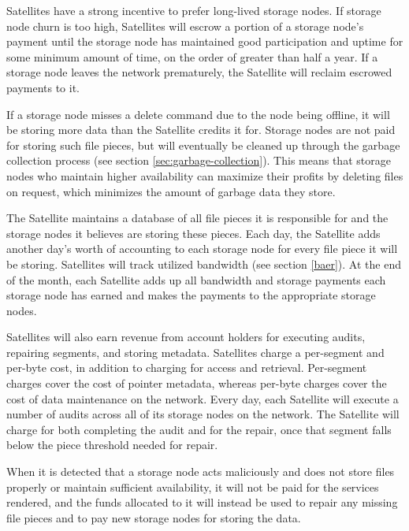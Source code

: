 \documentclass[8pt,fleqn,openany]{book}
\begin{document}
Satellites have a strong incentive to prefer long-lived storage nodes. If
storage node churn is too high, Satellites will escrow a portion of a storage
node's payment until the storage node has maintained good participation and
uptime for some minimum amount of time, on the order of greater than half a year.
If a storage node leaves the network prematurely, the Satellite will reclaim
escrowed payments to it.


If a storage node misses a delete command due to the node being
offline, it will be storing more data than the Satellite credits it for.
Storage nodes are not paid for storing such file pieces, but
will eventually be cleaned up through the garbage collection process
(see section \ref{sec:garbage-collection}).
This means that storage nodes who maintain higher availability
can maximize their profits by deleting files on request,
which minimizes the amount
of garbage data they store.

The Satellite maintains a database of all file pieces it is responsible for
and the storage nodes it believes are storing these pieces. Each day,
the Satellite adds another day's worth
of accounting to each storage node for every file
piece
it will be storing.
Satellites will track utilized bandwidth (see section \ref{baer}).
At the end of the month, each Satellite
adds up all bandwidth and storage payments each storage node has earned and
makes
the payments to the appropriate storage nodes.

Satellites will also earn revenue from account holders for executing audits,
repairing segments, and storing metadata. Satellites charge a per-segment and
per-byte cost, in addition to charging for access and retrieval. Per-segment
charges cover the cost of pointer metadata, whereas per-byte charges cover the
cost of data maintenance on the network.
Every day, each Satellite will execute
a number of audits across all of its storage nodes on the network.
The Satellite will charge for both completing the audit
and for the repair,
once that segment falls below the piece threshold needed for
repair.

When it is detected that a storage node acts
maliciously and does not store files properly or maintain sufficient
availability, it will not be paid for the services rendered, and the funds
allocated to it will instead be used to repair any missing
file pieces and to pay new storage nodes for storing the data.
\end{document}
